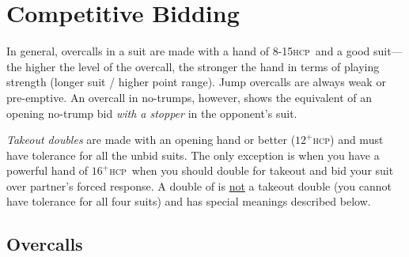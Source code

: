 \documentclass[a4paper,article,oneside]{memoir}
\newcommand{\hcp}{\textsc{hcp}}
\begin{document}
\section{Competitive Bidding}

In general, overcalls in a suit are made with a hand of 8-15\hcp\ and
a good suit---the higher the level of the overcall, the stronger the
hand in terms of playing strength (longer suit / higher point
range). Jump overcalls are always weak or pre-emptive. An overcall in
no-trumps, however, shows the equivalent of an opening no-trump bid
\emph{with a stopper} in the opponent's suit.

\emph{Takeout doubles} are made with an opening hand or better
($12^+$\hcp) and must have tolerance for all the unbid suits. The only
exception is when you have a powerful hand of $16^+$\hcp\ when you
should double for takeout and bid your suit over partner's forced
response. A double of  is \underline{not} a takeout double (you
cannot have tolerance for all four suits) and has special meanings
described below.

\subsection{Overcalls}
\end{document}
